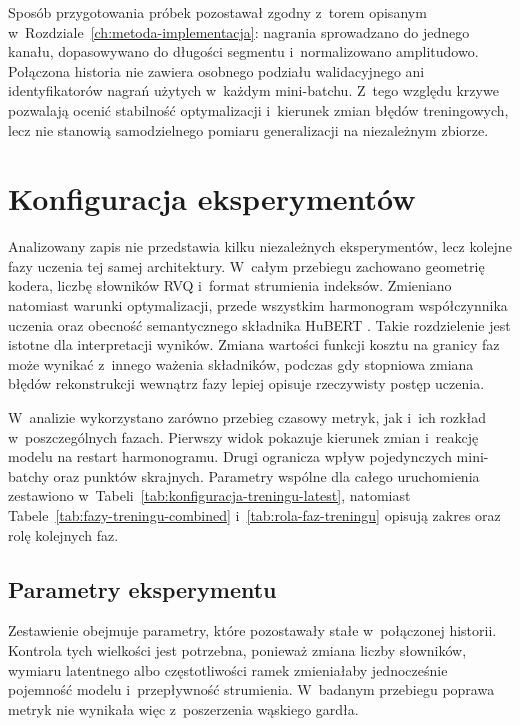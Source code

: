 Sposób przygotowania próbek pozostawał zgodny z~torem opisanym w~Rozdziale~\ref{ch:metoda-implementacja}: nagrania sprowadzano do jednego kanału, dopasowywano do długości segmentu i~normalizowano amplitudowo. Połączona historia nie zawiera osobnego podziału walidacyjnego ani identyfikatorów nagrań użytych w~każdym mini-batchu. Z~tego względu krzywe pozwalają ocenić stabilność optymalizacji i~kierunek zmian błędów treningowych, lecz nie stanowią samodzielnego pomiaru generalizacji na niezależnym zbiorze.

\section{Konfiguracja eksperymentów}
\label{sec:konfiguracja-eksperymentow}

Analizowany zapis nie przedstawia kilku niezależnych eksperymentów, lecz kolejne fazy uczenia tej samej architektury. W~całym przebiegu zachowano geometrię kodera, liczbę słowników RVQ i~format strumienia indeksów. Zmieniano natomiast warunki optymalizacji, przede wszystkim harmonogram współczynnika uczenia oraz obecność semantycznego składnika HuBERT \cite{Hsu2021HuBERT}. Takie rozdzielenie jest istotne dla interpretacji wyników. Zmiana wartości funkcji kosztu na granicy faz może wynikać z~innego ważenia składników, podczas gdy stopniowa zmiana błędów rekonstrukcji wewnątrz fazy lepiej opisuje rzeczywisty postęp uczenia.

W~analizie wykorzystano zarówno przebieg czasowy metryk, jak i~ich rozkład w~poszczególnych fazach. Pierwszy widok pokazuje kierunek zmian i~reakcję modelu na restart harmonogramu. Drugi ogranicza wpływ pojedynczych mini-batchy oraz punktów skrajnych. Parametry wspólne dla całego uruchomienia zestawiono w~Tabeli~\ref{tab:konfiguracja-treningu-latest}, natomiast Tabele~\ref{tab:fazy-treningu-combined} i~\ref{tab:rola-faz-treningu} opisują zakres oraz rolę kolejnych faz.

\subsection{Parametry eksperymentu}
\label{subsec:parametry-eksperymentu}

Zestawienie obejmuje parametry, które pozostawały stałe w~połączonej historii. Kontrola tych wielkości jest potrzebna, ponieważ zmiana liczby słowników, wymiaru latentnego albo częstotliwości ramek zmieniałaby jednocześnie pojemność modelu i~przepływność strumienia. W~badanym przebiegu poprawa metryk nie wynikała więc z~poszerzenia wąskiego gardła.

